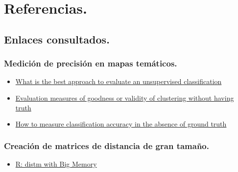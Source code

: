 \documentclass[]{article}
\providecommand{\tightlist}{%
  \setlength{\itemsep}{0pt}\setlength{\parskip}{0pt}}
\begin{document}
\section*{Referencias.}\label{referencias.}

\subsection*{Enlaces consultados.}\label{enlaces-consultados.}

\subsubsection*{Medición de precisión en mapas
temáticos.}\label{medicion-de-precision-en-mapas-tematicos.}

\begin{itemize}
\tightlist
\item
  \href{https://www.researchgate.net/post/What_is_the_best_approach_to_evaluate_an_unsupervised_classification}{What
  is the best approach to evaluate an unsupervised classification}
\item
  \href{https://stats.stackexchange.com/questions/21807/evaluation-measures-of-goodness-or-validity-of-clustering-without-having-truth}{Evaluation
  measures of goodness or validity of clustering without having truth}
\item
  \href{https://www.researchgate.net/post/How_to_measure_classification_accuracy_in_the_absence_of_ground_truth}{How
  to measure classification accuracy in the absence of ground truth}
\end{itemize}

\subsubsection*{Creación de matrices de distancia de gran
tamaño.}\label{creacion-de-matrices-de-distancia-de-gran-tamano.}

\begin{itemize}
\tightlist
\item
  \href{https://stackoverflow.com/questions/44313983/r-distm-with-big-memory/44321935\#44321935}{R:
  distm with Big Memory}
\end{itemize}
\end{document}
